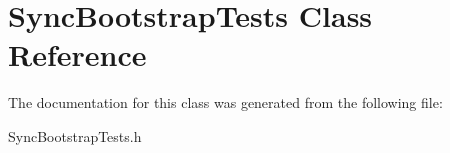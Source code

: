 \hypertarget{interface_sync_bootstrap_tests}{
\section{\-Sync\-Bootstrap\-Tests \-Class \-Reference}
\label{interface_sync_bootstrap_tests}
}


\-The documentation for this class was generated from the following file\-:\begin{DoxyCompactItemize}
\item 
\-Sync\-Bootstrap\-Tests.\-h\end{DoxyCompactItemize}
